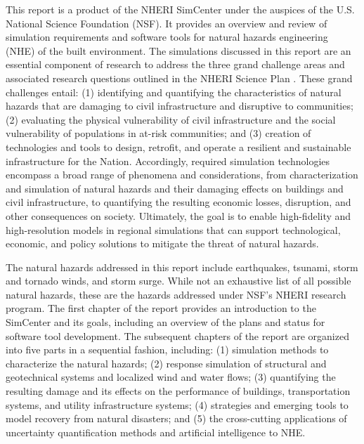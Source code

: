 %
%

\preface

This report is a product of the NHERI SimCenter under the auspices of the U.S. National Science Foundation (NSF). It provides an overview and review of simulation requirements and software tools for natural hazards engineering (NHE) of the built environment. The simulations discussed in this report are an essential component of research to address the three grand challenge areas and associated research questions outlined in the NHERI Science Plan \citep{edge2020natural}. These grand challenges entail: (1) identifying and quantifying the characteristics of natural hazards that are damaging to civil infrastructure and disruptive to communities; (2) evaluating the physical vulnerability of civil infrastructure and the social vulnerability of populations in at-risk communities; and (3) creation of technologies and tools to design, retrofit, and operate a resilient and sustainable infrastructure for the Nation. Accordingly, required simulation technologies encompass a broad range of phenomena and considerations, from characterization and simulation of natural hazards and their damaging effects on buildings and civil infrastructure, to quantifying the resulting economic losses, disruption, and other consequences on society. Ultimately, the goal is to enable high-fidelity and high-resolution models in regional simulations that can support technological, economic, and policy solutions to mitigate the threat of natural hazards.

The natural hazards addressed in this report include earthquakes, tsunami, storm and tornado winds, and storm surge. While not an exhaustive list of all possible natural hazards, these are the hazards addressed under NSF's NHERI research program. The first chapter of the report provides an introduction to the SimCenter and its goals, including an overview of the plans and status for software tool development.  The subsequent chapters of the report are organized into five parts in a sequential fashion, including: (1) simulation methods to characterize the natural hazards; (2) response simulation of structural and geotechnical systems and localized wind and water flows; (3) quantifying the resulting damage and its effects on the performance of buildings, transportation systems, and utility infrastructure systems; (4) strategies and emerging tools to model recovery from natural disasters; and (5) the cross-cutting applications of uncertainty quantification methods and artificial intelligence to NHE. 


